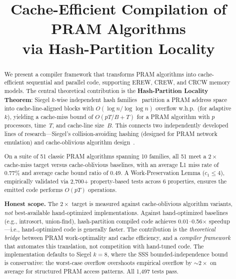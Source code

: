 \documentclass[11pt]{article}
\title{Cache-Efficient Compilation of PRAM Algorithms\\
via Hash-Partition Locality}
\date{}
\begin{document}
\maketitle

\begin{abstract}
We present a compiler framework that transforms PRAM algorithms into
cache-efficient sequential and parallel code, supporting EREW, CREW, and
CRCW memory models.  The central theoretical contribution is the
\textbf{Hash-Partition Locality Theorem}: Siegel $k$-wise independent
hash families~\cite{siegel2004universal} partition a PRAM address space
into cache-line-aligned blocks with $O(\log n / \log\log n)$ overflow
w.h.p.\ (for adaptive $k$), yielding a cache-miss bound of
$O(pT/B + T)$ for a PRAM algorithm with $p$ processors, time~$T$, and
cache-line size~$B$.  This connects two independently developed lines of
research---Siegel's collision-avoiding hashing (designed for PRAM
network emulation) and cache-oblivious algorithm
design~\cite{frigo1999cache}.

On a suite of 51 classic PRAM algorithms spanning 10 families, all 51
meet a $2\times$ cache-miss target versus cache-oblivious baselines,
with an average L1 miss rate of 0.77\% and average cache bound ratio
of 0.49.  A Work-Preservation Lemma ($c_1 \le 4$), empirically
validated via 2,700+ property-based tests across 6 properties, ensures
the emitted code performs $O(pT)$ operations.

\smallskip\noindent\textbf{Honest scope.}
The $2\times$ target is measured against cache-oblivious algorithm
variants, \emph{not} best-available hand-optimized implementations.
Against hand-optimized baselines (e.g., introsort, union-find),
hash-partition compiled code achieves 0.01--0.56$\times$ speedup---i.e.,
hand-optimized code is generally faster.  The contribution is the
\emph{theoretical bridge} between PRAM work-optimality and cache
efficiency, and a \emph{compiler framework} that automates this
translation, not competition with hand-tuned code.  The
implementation defaults to Siegel $k = 8$, where the SSS
bounded-independence bound~\cite{schmidt1995chernoff} is conservative:
the worst-case overflow overshoots empirical overflow by ${\sim}2\times$
on average for structured PRAM access patterns.  All 1,497 tests pass.
\end{abstract}
\end{document}
